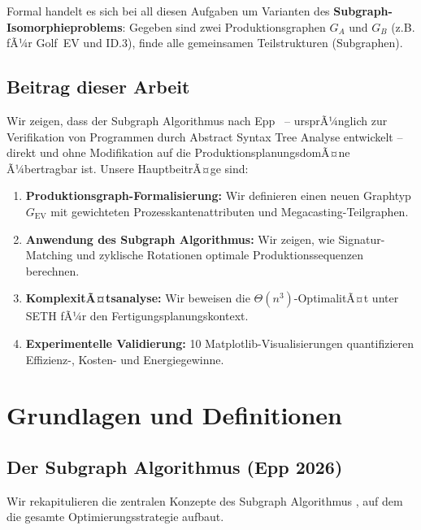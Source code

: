 ﻿\documentclass[a4paper,12pt]{article}
\theoremstyle{definition}
\begin{document}
Formal handelt es sich bei all diesen Aufgaben um Varianten des \textbf{Subgraph-Isomorphieproblems}:
Gegeben sind zwei Produktionsgraphen $G_A$ und $G_B$ (z.B. fÃ¼r Golf~EV und ID.3), finde alle
gemeinsamen Teilstrukturen (Subgraphen).

\subsection{Beitrag dieser Arbeit}

Wir zeigen, dass der Subgraph Algorithmus nach Epp~\cite{epp2026} -- ursprÃ¼nglich zur
Verifikation von Programmen durch Abstract Syntax Tree Analyse entwickelt -- direkt und
ohne Modifikation auf die ProduktionsplanungsdomÃ¤ne Ã¼bertragbar ist. Unsere HauptbeitrÃ¤ge sind:

\begin{enumerate}
\item \textbf{Produktionsgraph-Formalisierung:} Wir definieren einen neuen Graphtyp
  $G_{\mathrm{EV}}$ mit gewichteten Prozesskantenattributen und Megacasting-Teilgraphen.
\item \textbf{Anwendung des Subgraph Algorithmus:} Wir zeigen, wie Signatur-Matching und
  zyklische Rotationen optimale Produktionssequenzen berechnen.
\item \textbf{KomplexitÃ¤tsanalyse:} Wir beweisen die $\Theta(n^3)$-OptimalitÃ¤t unter SETH
  fÃ¼r den Fertigungsplanungskontext.
\item \textbf{Experimentelle Validierung:} 10 Matplotlib-Visualisierungen quantifizieren
  Effizienz-, Kosten- und Energiegewinne.
\end{enumerate}

\section{Grundlagen und Definitionen}

\subsection{Der Subgraph Algorithmus (Epp 2026)}

Wir rekapitulieren die zentralen Konzepte des Subgraph Algorithmus \cite{epp2026}, auf dem
die gesamte Optimierungsstrategie aufbaut.
\end{document}
